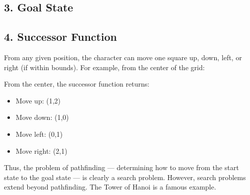 \documentclass[12pt]{article}
\begin{document}
\subsection*{3. Goal State}

\begin{center}
\end{center}

\subsection*{4. Successor Function}

From any given position, the character can move one square up, down, left, or right (if within bounds). For example, from the center of the grid:

\begin{center}
\end{center}

From the center, the successor function returns:
\begin{itemize}
    \item Move up: (1,2)
    \item Move down: (1,0)
    \item Move left: (0,1)
    \item Move right: (2,1)
\end{itemize}

\bigskip

Thus, the problem of pathfinding — determining how to move from the start state to the goal state — is clearly a search problem. However, search problems extend beyond pathfinding. The Tower of Hanoi is a famous example.
\end{document}
